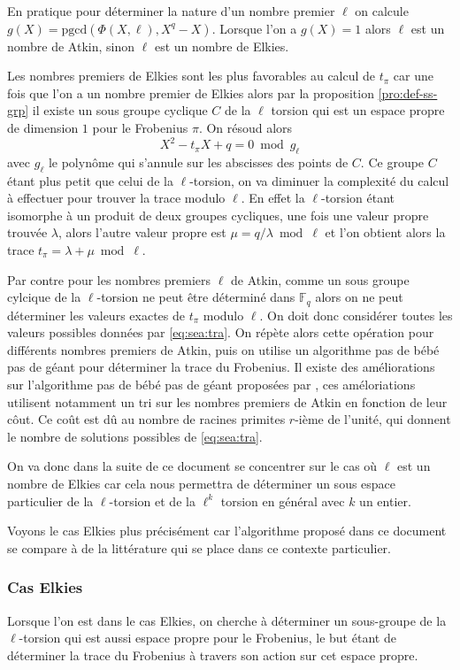 \documentclass[10pt,a4paper]{book}
\theoremstyle{plain}
\theoremstyle{definition}
\theoremstyle{definition}
\theoremstyle{definition}
\theoremstyle{definition}
\theoremstyle{remark}
\theoremstyle{remark}
\theoremstyle{definition}
\begin{document}
En pratique pour déterminer la nature d'un nombre premier $\ell$ on calcule $g(X)=\mathrm{pgcd}(\Phi(X,\ell),X^q-X)$. Lorsque l'on a $g(X)=1$  alors $\ell$ est un nombre de Atkin, sinon $\ell$ est un nombre de Elkies.

Les nombres premiers de Elkies sont les plus favorables au calcul de $t_{\pi}$ car une fois que l'on a un nombre premier de Elkies alors par la proposition \ref{pro:def-ss-grp} il existe un sous groupe cyclique $C$ de la $\ell$ torsion qui est un espace propre de dimension $1$ pour le Frobenius $\pi$. On résoud alors 
\begin{equation*}
X^2-t_{\pi}X+q = 0 \bmod g_{\ell}
\end{equation*} 
avec $g_{\ell}$ le polynôme qui s'annule sur les abscisses des points de $C$.
Ce groupe $C$ étant plus petit que celui de la $\ell$-torsion, on va diminuer la complexité du calcul à effectuer pour trouver la trace modulo $\ell$. En effet la $\ell$-torsion étant isomorphe à un produit de deux groupes cycliques, une fois une valeur propre trouvée $\lambda$, alors l'autre valeur propre est $\mu=q/\lambda \bmod \ell$ et l'on obtient alors la trace $t_{\pi}=\lambda+\mu \bmod \ell$. 

Par contre pour les nombres premiers $\ell$ de Atkin, comme un sous groupe cylcique de la $\ell$-torsion ne peut être déterminé dans $\mathbb{F}_q$ alors on ne peut déterminer les valeurs exactes de $t_{\pi}$ modulo $\ell$. On doit donc considérer toutes les valeurs possibles données par \eqref{eq:sea:tra}. On répète alors cette opération pour  différents nombres premiers de Atkin, puis on utilise un algorithme pas de bébé pas de géant pour déterminer la trace du Frobenius. Il existe des améliorations sur l'algorithme pas de bébé pas de géant proposées par \cite{Ler97a}, ces améloriations utilisent notamment un tri sur les nombres premiers de Atkin en fonction de leur côut. Ce coût est dû au nombre de racines primites $r$-ième de l'unité, qui donnent le nombre de solutions possibles de \eqref{eq:sea:tra}.


On va donc dans la suite de ce document se concentrer sur le cas où $\ell$ est un nombre de Elkies car cela nous permettra de déterminer un sous espace particulier de la $\ell$-torsion et de la $\ell^k$ torsion en général avec $k$ un entier.

Voyons le cas Elkies plus précisément car l'algorithme proposé dans ce document se compare à de la littérature qui se place dans ce contexte particulier.

\subsubsection{Cas Elkies} \label{sub:Elkies}
Lorsque l'on est dans le cas Elkies, on cherche à déterminer un sous-groupe de la $\ell$-torsion qui est aussi espace propre pour le Frobenius, le but étant de déterminer la trace du Frobenius à travers son action sur cet espace propre. 
\end{document}
